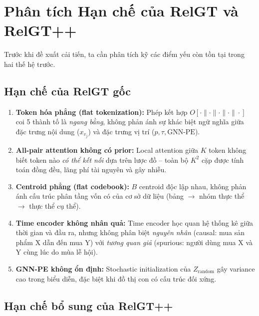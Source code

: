 \documentclass[12pt,a4paper]{article}
\begin{document}
\tableofcontents\newpage

\section{Phân tích Hạn chế của RelGT và RelGT++}

Trước khi đề xuất cải tiến, ta cần phân tích kỹ các điểm yếu còn tồn tại
trong hai thế hệ trước.

\subsection{Hạn chế của RelGT gốc}

\begin{warnbox}
\begin{enumerate}[leftmargin=1.2em]
  \item \textbf{Token hóa phẳng (flat tokenization):} Phép kết hợp
        $O[\cdot\|\cdot\|\cdot\|\cdot\|\cdot]$ coi 5 thành tố là \emph{ngang bằng},
        không phản ánh sự khác biệt ngữ nghĩa giữa đặc trưng nội dung
        ($x_{v_j}$) và đặc trưng vị trí ($p, \tau, \text{GNN-PE}$).
  \item \textbf{All-pair attention không có prior:} Local attention giữa
        $K$ token không biết token nào \emph{có thể kết nối} dựa trên lược
        đồ -- toàn bộ $K^2$ cặp được tính toán đồng đều, lãng phí tài nguyên
        và gây nhiễu.
  \item \textbf{Centroid phẳng (flat codebook):} $B$ centroid độc lập nhau,
        không phản ánh cấu trúc phân tầng vốn có của cơ sở dữ liệu (bảng $\to$
        nhóm thực thể $\to$ thực thể cụ thể).
  \item \textbf{Time encoder không nhân quả:} Time encoder học quan hệ thống
        kê giữa thời gian và đầu ra, nhưng không phân biệt \emph{nguyên nhân}
        (causal: mua sản phẩm X dẫn đến mua Y) với \emph{tương quan giả}
        (spurious: người dùng mua X và Y cùng lúc do mùa lễ hội).
  \item \textbf{GNN-PE không ổn định:} Stochastic initialization của $Z_\text{random}$
        gây variance cao trong biểu diễn, đặc biệt khi đồ thị con có cấu trúc
        đối xứng.
\end{enumerate}
\end{warnbox}

\subsection{Hạn chế bổ sung của RelGT++}
\end{document}
